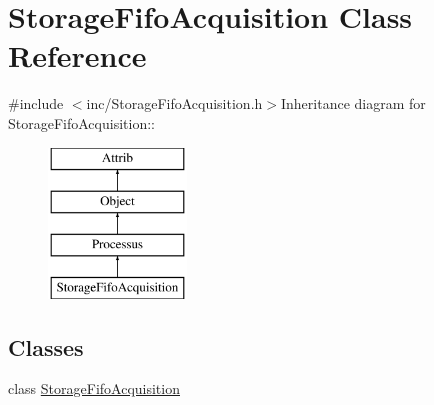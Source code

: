 \hypertarget{classStorageFifoAcquisition}{
\section{StorageFifoAcquisition Class Reference}
\label{classStorageFifoAcquisition}
}


{\ttfamily \#include $<$inc/StorageFifoAcquisition.h$>$}Inheritance diagram for StorageFifoAcquisition::\begin{figure}[H]
\begin{center}
\leavevmode
\includegraphics[height=4cm]{classStorageFifoAcquisition}
\end{center}
\end{figure}
\subsection*{Classes}
\begin{DoxyCompactItemize}
\item 
class \hyperlink{classStorageFifoAcquisition_1_1StorageFifoAcquisition}{StorageFifoAcquisition}
\end{DoxyCompactItemize}
